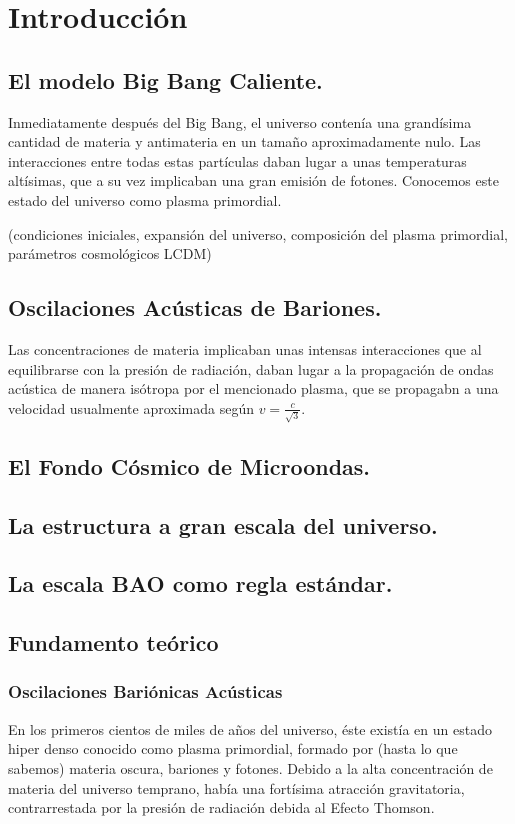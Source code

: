 \chapter{Introducción}

\section{El modelo Big Bang Caliente. }

Inmediatamente después del Big Bang, el universo contenía una grandísima cantidad de materia y antimateria en un tamaño aproximadamente nulo. Las interacciones entre todas estas partículas daban lugar a unas temperaturas altísimas, que a su vez implicaban una gran emisión de fotones. Conocemos este estado del universo como plasma primordial. 

(condiciones iniciales, expansión del universo, composición del plasma primordial, parámetros cosmológicos LCDM)

\section{Oscilaciones Acústicas de Bariones.}
Las concentraciones de materia implicaban unas intensas interacciones que al equilibrarse con la presión de radiación, daban lugar a la propagación de ondas acústica de manera isótropa por el mencionado plasma, que se propagabn a una velocidad usualmente aproximada según $v = \frac{c}{\sqrt{3} }$. 

\section{El Fondo Cósmico de Microondas.}

\section{La estructura a gran escala del universo.}

\section{La escala BAO como regla estándar.}






\section{Fundamento teórico}
\subsection{Oscilaciones Bariónicas Acústicas}
En los primeros cientos de miles de años del universo, éste existía en un estado hiper denso conocido como plasma primordial, formado por (hasta lo que sabemos) materia oscura, bariones y fotones.
Debido a la alta concentración de materia del universo temprano, había una fortísima atracción gravitatoria, contrarrestada por la presión de radiación debida al Efecto Thomson. 

